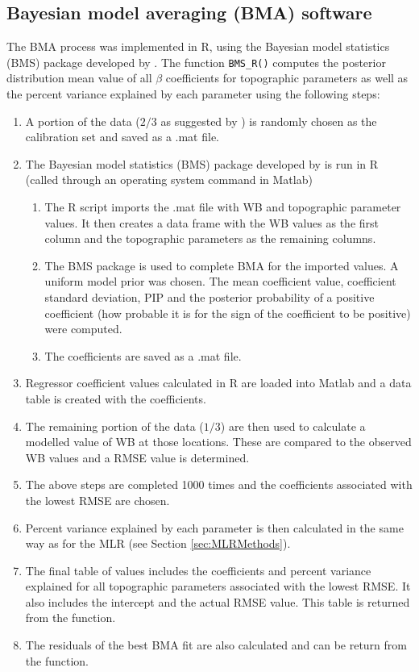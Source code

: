 \documentclass{sfuthesis}
\begin{document}
{\begin{appendices}
	\chapter{Bayesian model averaging (BMA) software}
\label{sec:BMAmethods}
The BMA process was implemented in R, using the Bayesian model statistics (BMS) package developed by \cite{Zeugner2015}. The function \texttt{BMS\_R()} computes the posterior distribution mean value of all $\beta$ coefficients for topographic parameters as well as the percent variance explained by each parameter using the following steps:
\begin{enumerate}
\item A portion of the data ($2/3$ as suggested by \cite{Kohavi1995}) is randomly chosen as the calibration set and saved as a .mat file. 
\item The Bayesian model statistics (BMS) package developed by \cite{Zeugner2015} is run in R (called through an operating system command in Matlab)
	\begin{enumerate}
		\item The R script imports the .mat file with WB and topographic parameter values. It then creates a data frame with the WB values as the first column and the topographic parameters as the remaining 	columns. 
		\item The BMS package is used to complete BMA for the imported values. A uniform model prior was chosen. The mean coefficient value, coefficient standard deviation, PIP and the posterior probability of a positive coefficient (how probable it is for the sign of the coefficient to be positive) were computed.
		\item The coefficients are saved as a .mat file.
	\end{enumerate}
\item Regressor coefficient values calculated in R are loaded into Matlab and a data table is created with the coefficients.
\item The remaining portion of the data ($1/3$) are then used to calculate a modelled value of WB at those locations. These are compared to the observed WB values and a RMSE value is determined.
\item The above steps are completed 1000 times and the coefficients associated with the lowest RMSE are chosen.
\item Percent variance explained by each parameter is then calculated in the same way as for the MLR (see Section \ref{sec:MLRMethods}). 
\item The final table of values includes the coefficients and percent variance explained for all topographic parameters associated with the lowest RMSE. It also includes the intercept and the actual RMSE value. This table is returned from the function.
\item The residuals of the best BMA fit are also calculated and can be return from the function.  
\end{enumerate}
	



\end{appendices}}
\end{document}
